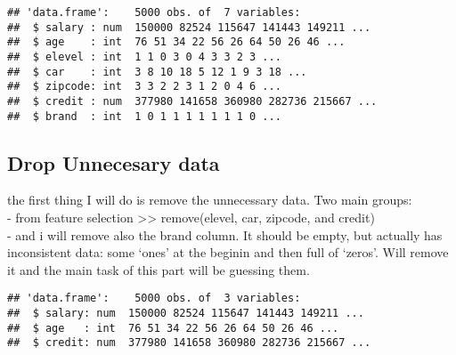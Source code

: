 \documentclass[
]{article}
\newenvironment{Shaded}{\begin{snugshade}}{\end{snugshade}}
\newcommand{\CommentTok}[1]{\textcolor[rgb]{0.56,0.35,0.01}{\textit{#1}}}
\newcommand{\ConstantTok}[1]{\textcolor[rgb]{0.00,0.00,0.00}{#1}}
\newcommand{\FunctionTok}[1]{\textcolor[rgb]{0.00,0.00,0.00}{#1}}
\newcommand{\NormalTok}[1]{#1}
\newcommand{\OtherTok}[1]{\textcolor[rgb]{0.56,0.35,0.01}{#1}}
\newcommand{\SpecialCharTok}[1]{\textcolor[rgb]{0.00,0.00,0.00}{#1}}
\begin{document}
\begin{verbatim}
## 'data.frame':    5000 obs. of  7 variables:
##  $ salary : num  150000 82524 115647 141443 149211 ...
##  $ age    : int  76 51 34 22 56 26 64 50 26 46 ...
##  $ elevel : int  1 1 0 3 0 4 3 3 2 3 ...
##  $ car    : int  3 8 10 18 5 12 1 9 3 18 ...
##  $ zipcode: int  3 3 2 2 3 1 2 0 4 6 ...
##  $ credit : num  377980 141658 360980 282736 215667 ...
##  $ brand  : int  1 0 1 1 1 1 1 1 1 0 ...
\end{verbatim}

\hypertarget{drop-unnecesary-data}{%
\subsection{Drop Unnecesary data}\label{drop-unnecesary-data}}

the first thing I will do is remove the unnecessary data. Two main
groups:\\
- from feature selection \textgreater\textgreater{} remove(elevel, car,
zipcode, and credit)\\
- and i will remove also the brand column. It should be empty, but
actually has inconsistent data: some `ones' at the beginin and then full
of `zeros'. Will remove it and the main task of this part will be
guessing them.

\begin{Shaded}
\end{Shaded}

\begin{verbatim}
## 'data.frame':    5000 obs. of  3 variables:
##  $ salary: num  150000 82524 115647 141443 149211 ...
##  $ age   : int  76 51 34 22 56 26 64 50 26 46 ...
##  $ credit: num  377980 141658 360980 282736 215667 ...
\end{verbatim}
\end{document}
